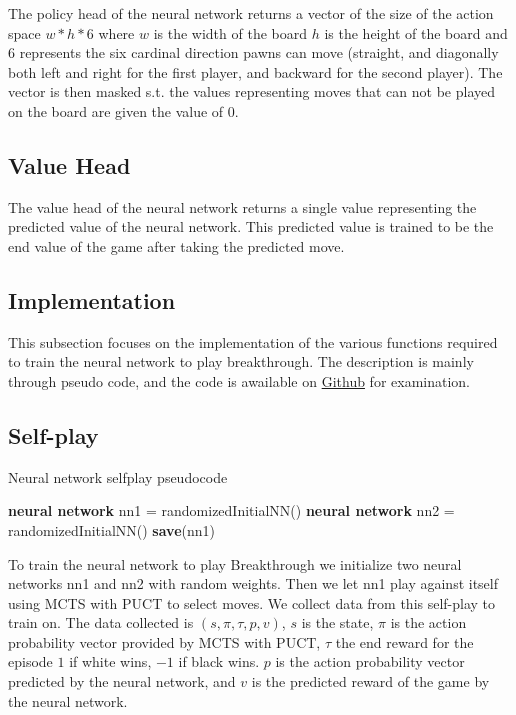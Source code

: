 The policy head of the neural network returns a vector of the size of the action space $w * h * 6$ where $w$ is the width of the board $h$ is the height of the board and $6$ represents the six cardinal direction pawns can move (straight, and diagonally both left and right for the first player, and backward for the second player). The vector is then masked s.t. the values representing moves that can not be played on the board are given the value of $0$.

\subsection{Value Head}

The value head of the neural network returns a single value representing the predicted value of the neural network. This predicted value is trained to be the end value of the game after taking the predicted move.

\subsection{Implementation}

This subsection focuses on the implementation of the various functions required to train the neural network to play breakthrough. The description is mainly through pseudo code, and the code is awailable on \href{github.com/sigurdurhelga/msc-cheis}{Github} for examination.

\subsection{Self-play}

\begin{algorithm}[t]
\caption{Neural network selfplay pseudocode}
\label{alg:selfplay}
\begin{algorithmic}[1]
\STATE \textbf{neural network} nn1 = randomizedInitialNN()
\STATE \textbf{neural network} nn2 = randomizedInitialNN()
\WHILE{\TRUE}
    \ELSE
    \ENDIF
    \STATE \textbf{save}(nn1)
\ENDWHILE
\end{algorithmic}
\end{algorithm}

To train the neural network to play Breakthrough we initialize two neural networks nn1 and nn2 with random weights. Then we let nn1 play against itself using MCTS with PUCT to select moves. We collect data from this self-play to train on. The data collected is $(s, \pi, \tau, p, v)$, $s$ is the state, $\pi$ is the action probability vector provided by MCTS with PUCT, $\tau$ the end reward for the episode $1$ if white wins, $-1$ if black wins. $p$ is the action probability vector predicted by the neural network, and $v$ is the predicted reward of the game by the neural network.

